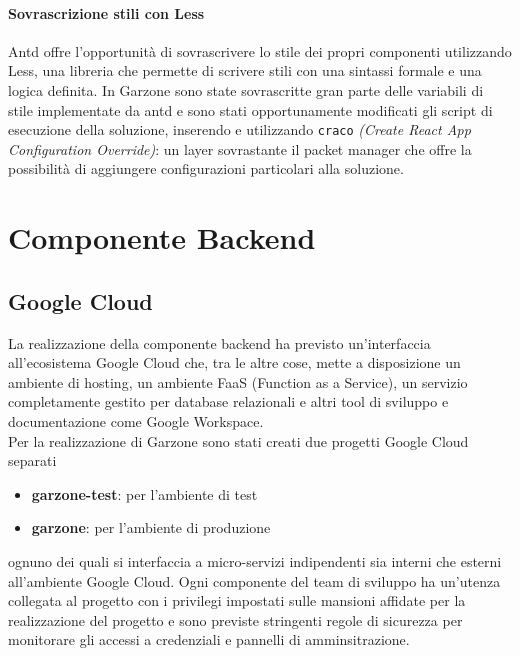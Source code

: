 \paragraph{Sovrascrizione stili con Less} Antd offre l'opportunità di sovrascrivere lo stile dei propri componenti utilizzando Less, una libreria che permette di scrivere stili con una sintassi formale e una logica definita. In Garzone sono state sovrascritte gran parte delle variabili di stile implementate da antd e sono stati opportunamente modificati gli script di esecuzione della soluzione, inserendo e utilizzando \lstinline[basicstyle=\ttfamily]!craco! \textit{(Create React App Configuration Override)}: un layer sovrastante il packet manager che offre la possibilità di aggiungere configurazioni particolari alla soluzione. 
\newpage
\section{Componente Backend}
\subsection{Google Cloud}
La realizzazione della componente backend ha previsto un'interfaccia all'ecosistema Google Cloud che, tra le altre cose, mette a disposizione un ambiente di hosting, un ambiente FaaS (Function as a Service), un servizio completamente gestito per database relazionali e altri tool di sviluppo e documentazione come Google Workspace. \\ Per la realizzazione di Garzone sono stati creati due progetti Google Cloud separati
\begin{itemize}
    \item \textbf{garzone-test}: per l'ambiente di test
    \item \textbf{garzone}: per l'ambiente di produzione
\end{itemize} 
ognuno dei quali si interfaccia a micro-servizi indipendenti sia interni che esterni all'ambiente Google Cloud. Ogni componente del team di sviluppo ha un'utenza collegata al progetto con i privilegi impostati sulle mansioni affidate per la realizzazione del progetto e sono previste stringenti regole di sicurezza per monitorare gli accessi a credenziali e pannelli di amminsitrazione. 
